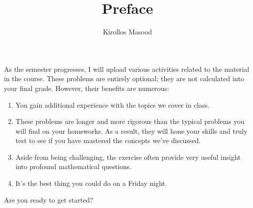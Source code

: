 \documentclass{ximera}
\title{Preface}
\author{Kirollos Masood}
\begin{document}
\begin{abstract}
\end{abstract}
\maketitle

\begin{sectionOutcomes}
	As the semester progresses, I will upload various activities related to the material in the course. These problems are entirely optional; they are not calculated into your final grade. However, their benefits are numerous:
	\begin{enumerate}
		
		\item
		You gain additional experience with the topics we cover in class.
		
		\item
		These problems are longer and more rigorous than the typical problems you will find on your homeworks. As a result, they will hone your skills and truly test to see if you have mastered the concepts we've discussed.
		
		\item
		Aside from being challenging, the exercise often provide very useful insight into profound mathematical questions.
		
		\item
		It's the best thing you could do on a Friday night.
		
	\end{enumerate}
	
\end{sectionOutcomes}

\begin{exercise}
	Are you ready to get started?
\end{exercise}
\end{document}

